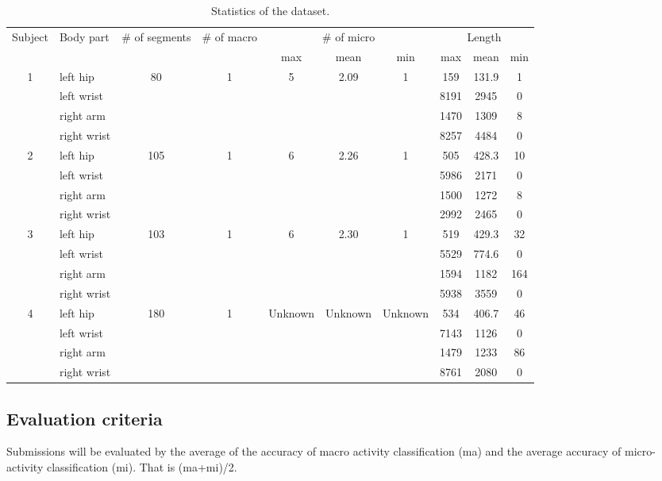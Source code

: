 \documentclass{svmult}
\begin{document}
\begin{table}[h]
    \centering
    \begin{tabular}{c|l|c|c|c|c|c|c|c|c}\hline\hline
        Subject &Body part& \# of segments &\# of macro& \multicolumn{3}{c|}{\# of micro}& \multicolumn{3}{c}{Length}  \\
         &&&&max&mean&min&max&mean&min\\\hline
        \multirow{4}{*}{1} & left hip& \multirow{4}{*}{80} &\multirow{4}{*}{1}&\multirow{4}{*}{5}&\multirow{4}{*}{2.09}&\multirow{4}{*}{1}  &159&131.9&1 \\
          & left wrist&&&&&&8191&2945&0\\
          & right arm&&&&&&1470&1309&8\\
          & right wrist&&&&&&8257&4484&0\\\hline
        \multirow{4}{*}{2}& left hip& \multirow{4}{*}{105}&\multirow{4}{*}{1}&\multirow{4}{*}{6}&\multirow{4}{*}{2.26}&\multirow{4}{*}{1}&505&428.3&10   \\
          & left wrist&&&&&&5986&2171&0\\
          & right arm&&&&&&1500&1272&8\\
          & right wrist&&&&&&2992&2465&0\\\hline
        \multirow{4}{*}{3} & left hip& \multirow{4}{*}{103}&\multirow{4}{*}{1}&\multirow{4}{*}{6}&\multirow{4}{*}{2.30}&\multirow{4}{*}{1}&519&429.3&32  \\
          & left wrist&&&&&&5529&774.6&0\\
          & right arm&&&&&&1594&1182&164\\
          & right wrist&&&&&&5938&3559&0\\\hline
        \multirow{4}{*}{4} & left hip & \multirow{4}{*}{180}&\multirow{4}{*}{1}&\multirow{4}{*}{Unknown}&\multirow{4}{*}{Unknown}&\multirow{4}{*}{Unknown}&534&406.7&46 \\
          & left wrist&&&&&&7143&1126&0\\
          & right arm&&&&&&1479&1233&86\\
          & right wrist&&&&&&8761&2080&0\\\hline
    \end{tabular}
    \caption{Statistics of the dataset.}
    \label{tab:stats}
\end{table}

\subsection{Evaluation criteria}
Submissions will be evaluated by the average of the accuracy of macro activity classification (ma) and the average accuracy of micro-activity classification (mi). That is (ma+mi)/2.
\end{document}
